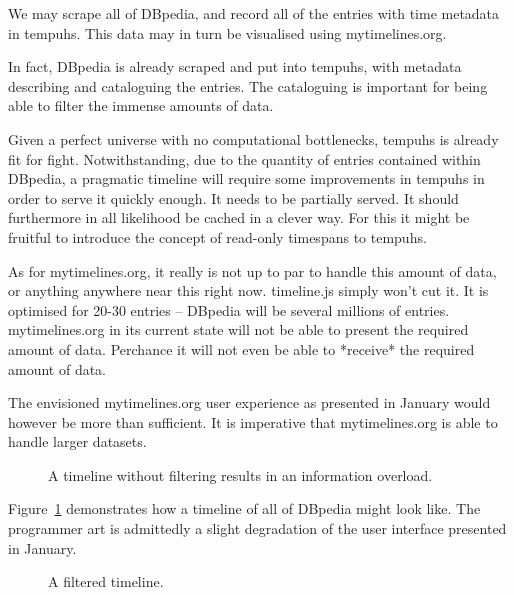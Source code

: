 We may scrape all of DBpedia, and record all of the entries with time metadata 
in tempuhs. This data may in turn be visualised using mytimelines.org.

In fact, DBpedia is already scraped and put into tempuhs, with metadata 
describing and cataloguing the entries. The cataloguing is important for being
able to filter the immense amounts of data.

Given a perfect universe with no computational bottlenecks, tempuhs is already 
fit for fight. Notwithstanding, due to the quantity of entries contained 
within DBpedia, a pragmatic timeline will require some improvements in tempuhs 
in order to serve it quickly enough. It needs to be partially served. It 
should furthermore in all likelihood be cached in a clever way. For this it 
might be fruitful to introduce the concept of read-only timespans to tempuhs.

As for mytimelines.org, it really is not up to par to handle this amount of 
data, or anything anywhere near this right now. timeline.js simply won't cut 
it. It is optimised for 20-30 entries\cite{timelinejsfaq} -- DBpedia will be 
several millions of entries. mytimelines.org in its current state will not be 
able to present the required amount of data. Perchance it will not even be 
able to *receive* the required amount of data.

The envisioned mytimelines.org user experience as presented in 
January\cite{timelinesjanuary} would however be more than sufficient. It is 
imperative that mytimelines.org is able to handle larger datasets.

\begin{figure}[H]
  \centering
  \begin{scale}{0.3}
    
  \end{scale}
  \caption{A timeline without filtering results in an information overload.}
  \label{fig:overload}
\end{figure}

Figure~\ref{fig:overload} demonstrates how a timeline of all of DBpedia might 
look like. The programmer art is admittedly a slight degradation of the user 
interface presented in January.

\begin{figure}[H]
  \centering
  \begin{scale}{0.3}
    
  \end{scale}
  \caption{A filtered timeline.}
  \label{fig:filtered}
\end{figure}

